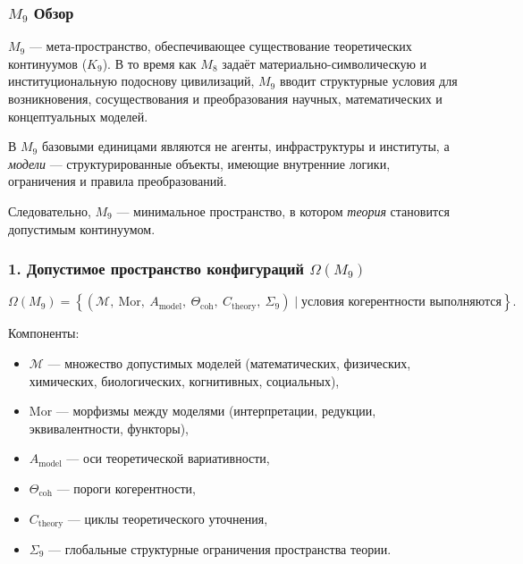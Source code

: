 

\subsubsection{\texorpdfstring{$M_9$}{M_9} Обзор}
\label{sec:m9-overview}

$M_9$ — мета-пространство, обеспечивающее существование
теоретических континуумов ($K_9$).
В то время как $M_8$ задаёт материально-символическую и институциональную
подоснову цивилизаций, $M_9$ вводит структурные условия для
возникновения, сосуществования и преобразования
научных, математических и концептуальных моделей.

В $M_9$ базовыми единицами являются не агенты, инфраструктуры и
институты, а \emph{модели} — структурированные объекты,
имеющие внутренние логики, ограничения и правила преобразований.

Следовательно, $M_9$ — минимальное пространство, в котором
\emph{теория} становится допустимым континуумом.

\subsubsection*{1. Допустимое пространство конфигураций \texorpdfstring{$\Omega(M_9)$}{\Omega(M_9)}}

\[
\Omega(M_9)=
\left\{
(\mathcal{M},\ \mathrm{Mor},\ A_{\mathrm{model}},\
\Theta_{\mathrm{coh}},\ C_{\mathrm{theory}},\ \Sigma_9)
\mid \text{условия когерентности выполняются}
\right\}.
\]

Компоненты:

\begin{itemize}
    \item $\mathcal{M}$ — множество допустимых моделей
        (математических, физических, химических, биологических, когнитивных, социальных),
    \item $\mathrm{Mor}$ — морфизмы между моделями
        (интерпретации, редукции, эквивалентности, функторы),
    \item $A_{\mathrm{model}}$ — оси теоретической вариативности,
    \item $\Theta_{\mathrm{coh}}$ — пороги когерентности,
    \item $C_{\mathrm{theory}}$ — циклы теоретического уточнения,
    \item $\Sigma_9$ — глобальные структурные ограничения пространства теории.
\end{itemize}

